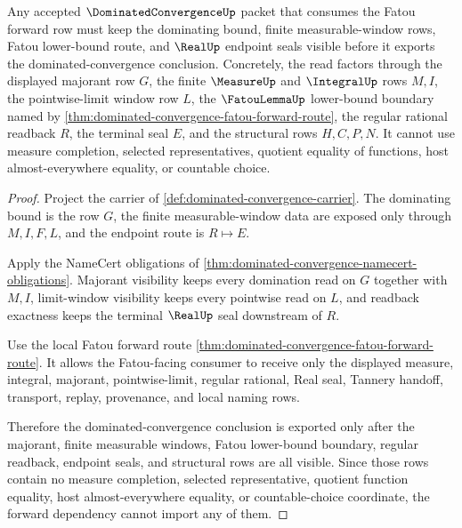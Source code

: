 \begin{theorem}
\label{thm:dominated-convergence-fatou-forward-dependency}
Any accepted $\DominatedConvergenceUp$ packet that consumes the Fatou forward row must keep the dominating bound, finite measurable-window rows, Fatou lower-bound route, and $\RealUp$ endpoint seals visible before it exports the dominated-convergence conclusion. Concretely, the read factors through the displayed majorant row $G$, the finite $\MeasureUp$ and $\IntegralUp$ rows $M,I$, the pointwise-limit window row $L$, the $\FatouLemmaUp$ lower-bound boundary named by \autoref{thm:dominated-convergence-fatou-forward-route}, the regular rational readback $R$, the terminal seal $E$, and the structural rows $H,C,P,N$. It cannot use measure completion, selected representatives, quotient equality of functions, host almost-everywhere equality, or countable choice.
\end{theorem}
\begin{proof}
Project the carrier of \autoref{def:dominated-convergence-carrier}. The dominating bound is the row $G$, the finite measurable-window data are exposed only through $M,I,F,L$, and the endpoint route is $R \longmapsto E$.

Apply the NameCert obligations of \autoref{thm:dominated-convergence-namecert-obligations}. Majorant visibility keeps every domination read on $G$ together with $M,I$, limit-window visibility keeps every pointwise read on $L$, and readback exactness keeps the terminal $\RealUp$ seal downstream of $R$.

Use the local Fatou forward route \autoref{thm:dominated-convergence-fatou-forward-route}. It allows the Fatou-facing consumer to receive only the displayed measure, integral, majorant, pointwise-limit, regular rational, Real seal, Tannery handoff, transport, replay, provenance, and local naming rows.

Therefore the dominated-convergence conclusion is exported only after the majorant, finite measurable windows, Fatou lower-bound boundary, regular readback, endpoint seals, and structural rows are all visible. Since those rows contain no measure completion, selected representative, quotient function equality, host almost-everywhere equality, or countable-choice coordinate, the forward dependency cannot import any of them.
\end{proof}

